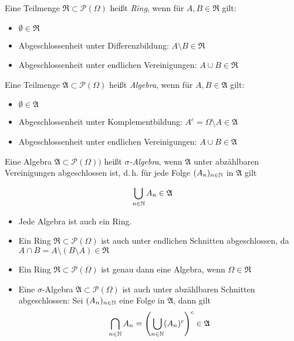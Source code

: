 \documentclass{cheat-sheet}
\newcommand{\PS}{\mathcal{P}} %
\newcommand{\PSO}{\PS(\Omega)} %
\newcommand{\Alg}{\mathfrak{A}}
\newcommand{\Ring}{\mathfrak{R}}
\begin{document}
\begin{defn}
  Eine Teilmenge $\Ring \subset \PSO$ heißt \emph{Ring}, wenn für $A, B \in \Ring$ gilt:
  \begin{itemize}
    \item $\emptyset \in \Ring$
    \item Abgeschlossenheit unter Differenzbildung: $A \setminus B \in \Ring$
    \item Abgeschlossenheit unter endlichen Vereinigungen: $A \cup B \in \Ring$
  \end{itemize}
\end{defn}

\begin{defn}
  Eine Teilmenge $\Alg \subset \PSO$ heißt \emph{Algebra}, wenn für $A, B \in \Alg$ gilt:
  \begin{itemize}
    \item $\emptyset \in \Alg$
    \item Abgeschlossenheit unter Komplementbildung: $A^c = \Omega \setminus A \in \Alg$
    \item Abgeschlossenheit unter endlichen Vereinigungen: $A \cup B \in \Alg$
  \end{itemize}
\end{defn}

\begin{defn}
  Eine Algebra $\Alg \subset \PSO)$ heißt \emph{$\sigma$-Algebra}, wenn $\Alg$ unter abzählbaren Vereinigungen abgeschlossen ist, d.\,h. für jede Folge $(A_n)_{n \in \mathbb{N}}$ in $\Alg$ gilt

  \[ \bigcup_{n \in \N} A_n \in \Alg \]
\end{defn}

\begin{bem}
  \begin{itemize}
    \item Jede Algebra ist auch ein Ring.
    \item Ein Ring $\Ring \subset \PSO$ ist auch unter endlichen Schnitten abgeschlossen, da $A \cap B = A \setminus (B \setminus A) \in \Ring$
    \item Ein Ring $\Ring \subset \PSO$ ist genau dann eine Algebra, wenn $\Omega \in \Ring$
    \item Eine $\sigma$-Algebra $\Alg \subset \PSO$ ist auch unter abzählbaren Schnitten abgeschlossen: Sei $(A_n)_{n \in \mathbb{N}}$ eine Folge in $\Alg$, dann gilt
      \[ \bigcap_{n \in \N} A_n = \left( \bigcup_{n \in \N} (A_n)^c \right)^c \in \Alg \]
  \end{itemize}
\end{bem}
\end{document}
